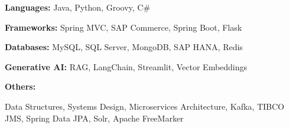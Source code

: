 \begin{cvskills}

  \cvskill
    {\bf Languages:}
    { Java, Python, Groovy, C\#}

  \cvskill
    {\bf Frameworks:}
    {Spring MVC, SAP Commerce, Spring Boot, Flask}

  \cvskill
    {\bf Databases:}
    {MySQL, SQL Server, MongoDB, SAP HANA, Redis}

  \cvskill
    {\bf Generative AI:}
    {RAG, LangChain, Streamlit, Vector Embeddings}

  \cvskill
    {\bf Others:}
    {\parbox[t]{0.95\linewidth}{Data Structures, Systems Design, Microservices Architecture, Kafka, TIBCO JMS, Spring Data JPA, Solr, Apache FreeMarker}}

\end{cvskills}
